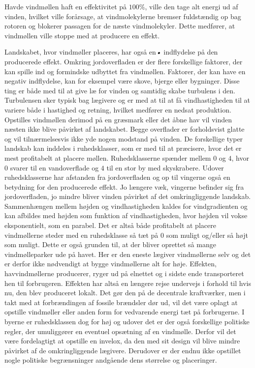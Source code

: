 Havde vindmøllen haft en effektivitet på $100 \%$, ville den tage alt energi ud af vinden, hvilket ville forårsage, at vindmolekylerne bremser fuldstændig op bag rotoren og blokerer passagen for de næste vindmolekyler. Dette medfører, at vindmøllen ville stoppe med at producere en effekt. 

Landskabet, hvor vindmøller placeres, har også en\textsl{•} indflydelse på den producerede effekt. Omkring jordoverfladen er der flere forskellige faktorer, der kan spille ind og formindske udbyttet fra vindmøllen. Faktorer, der kan have en negativ indflydelse, kan for eksempel være skove, bjerge eller bygninger. Disse ting er både med til at give læ for vinden og samtidig skabe turbulens i den. Turbulensen sker typisk bag lægivere og er med at til at få vindhastigheden til at variere både i hastighed og retning, hvilket medfører en nedsat produktion. 
Opstilles vindmøllen derimod på en græsmark eller det åbne hav vil vinden næsten ikke blive påvirket af landskabet. Begge overflader er forholdsvist glatte og vil tilnærmelsesvis ikke yde nogen modstand på vinden. 
De forskellige typer landskab kan inddeles i ruhedsklasser, som er med til at præcisere, hvor det er mest profitabelt at placere møllen. Ruhedsklasserne spænder mellem $0$ og $4$, hvor $0$ svarer til en vandoverflade og $4$ til en stor by med skyskrabere. 
Udover ruhedsklasserne har afstanden fra jordoverfladen og op til vingerne også en betydning for den producerede effekt. Jo længere væk, vingerne befinder sig fra jordoverfladen, jo mindre bliver vinden påvirket af det omkringliggende landskab. Sammenhængen mellem højden og vindhastigheden kaldes for vindgradienten og kan afbildes med højden som funktion af vindhastigheden, hvor højden vil vokse eksponentielt, som en parabel. 
Det er altså både profitabelt at placere vindmøllerne steder med en ruhedsklasse så tæt på $0$ som muligt og/eller så højt som muligt. Dette er også grunden til, at der bliver oprettet så mange vindmølleparker ude på havet. Her er den eneste lægiver vindmøllerne selv og det er derfor ikke nødvendigt at bygge vindmøllerne alt for høje. 
Effekten, havvindmøllerne producerer, ryger ud på elnettet og i sidste ende transporteret hen til forbrugeren. Effekten har altså en længere rejse undervejs i forhold til hvis nu, den blev produceret lokalt. Det gør den på de decentrale kraftværker, men i takt med at forbrændingen af fossile brændsler dør ud, vil det være oplagt at opstille vindmøller eller anden form for vedvarende energi tæt på forbrugerne. I byerne er ruhedsklassen dog for høj og udover det er der også forskellige politiske regler, der umuliggører en eventuel opsætning af en vindmølle. 
Derfor vil det være fordelagtigt at opstille en invelox, da den med sit design vil blive mindre påvirket af de omkringliggende lægivere. Derudover er der endnu ikke opstillet nogle politiske begrænsninger andgående dens størrelse og placeringer. 